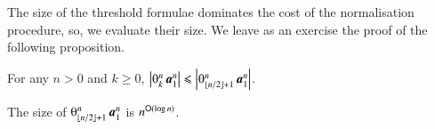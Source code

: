 % 
% 
% 

The size of the threshold formulae dominates the cost of the normalisation procedure, so, we evaluate their size. We leave as an exercise the proof of the following proposition.

\begin{proposition}\label{proposition:LargestThresholdFormula}
For any $n>0$ and $k\ge0$, $\size{\th kn\avec1n}\le\size{\th{\lfloor n/2\rfloor+1}n\avec1n}$.
\end{proposition}

\begin{lemma}\label{lemma:SizeThresholdMax}
The size of\/ $\th{\lfloor n/2\rfloor+1}n\avec1n$ is $n^{{\mathsf O}(\log n)}$.
\end{lemma}

